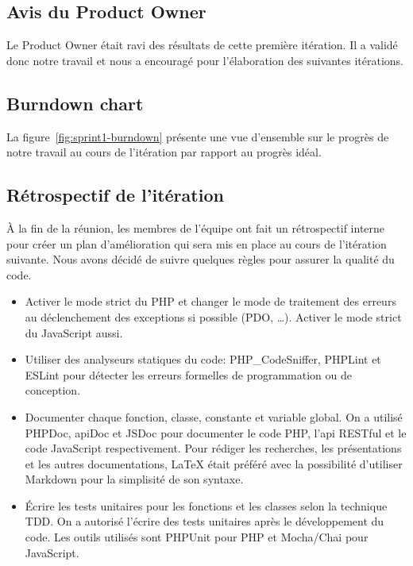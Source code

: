 \subsection{Avis du Product Owner}

Le Product Owner était ravi des résultats de cette première itération. Il a
validé donc notre travail et nous a encouragé pour l'élaboration des suivantes
itérations.

\subsection{Burndown chart}

La figure~\ref{fig:sprint1-burndown} présente une vue d'ensemble sur le progrès
de notre travail au cours de l'itération par rapport au progrès idéal.



\subsection{Rétrospectif de l'itération}

À la fin de la réunion, les membres de l'équipe ont fait un rétrospectif
interne pour créer un plan d'amélioration qui sera mis en place au cours de
l'itération suivante.  Nous avons décidé de suivre quelques règles pour assurer
la qualité du code.

\begin{itemize}
    \item Activer le mode strict du PHP et changer le mode de traitement des
        erreurs au déclenchement des exceptions si possible (PDO, \ldots).
        Activer le mode strict du JavaScript aussi.
    \item Utiliser des analyseurs statiques du code: PHP\_CodeSniffer, PHPLint
        et ESLint pour détecter les erreurs formelles de programmation ou de
        conception.
    \item Documenter chaque fonction, classe, constante et variable global. On
        a utilisé PHPDoc, apiDoc et JSDoc pour documenter le code PHP, l'api
        RESTful et le code JavaScript respectivement. Pour rédiger les
        recherches, les présentations et les autres documentations, \LaTeX{}
        était préféré avec la possibilité d'utiliser Markdown pour la
        simplisité de son syntaxe.
    \item Écrire les tests unitaires pour les fonctions et les classes selon la
        technique \acrshort{TDD}. On a autorisé l'écrire des tests unitaires
        après le développement du code. Les outils utilisés sont PHPUnit pour
        PHP et Mocha/Chai pour JavaScript.
\end{itemize}

